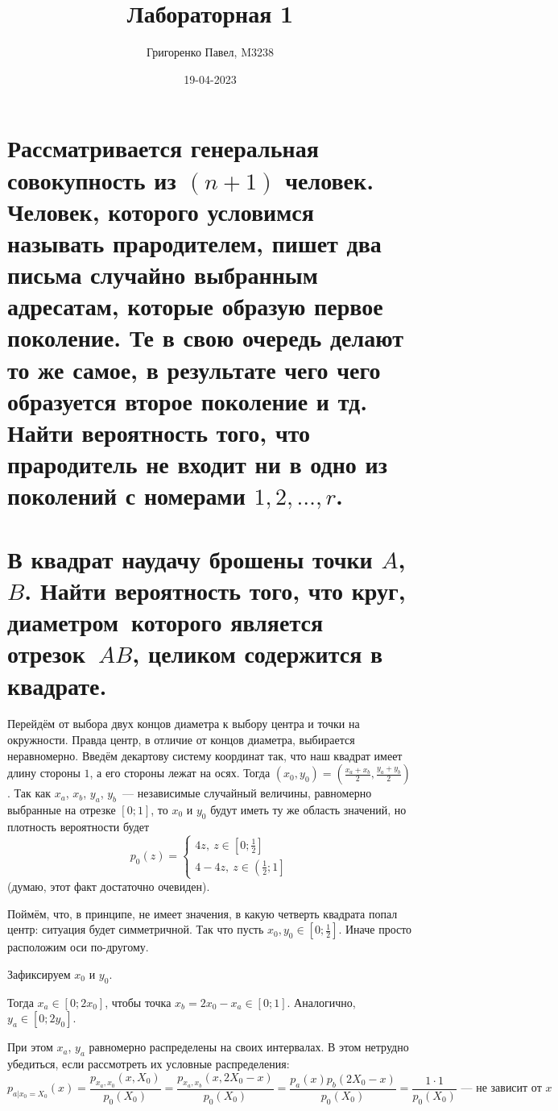 \documentclass{report}
\title{Лабораторная 1}
\author{Григоренко Павел, M3238}
\date{19-04-2023}
\begin{document}
\maketitle
\chapter{
Рассматривается генеральная совокупность из $(n+1)$ человек.
Человек, которого условимся называть прародителем,
пишет два письма случайно выбранным адресатам,
которые образую первое поколение.
Те в свою очередь делают то же самое,
в результате чего чего образуется второе поколение и тд.
Найти вероятность того, что прародитель не входит ни в одно из поколений с номерами $1,2,\dots,r$.
}

\chapter{
В квадрат наудачу брошены точки $A$, $B$.
Найти вероятность того, что круг, диаметром~которого является отрезок~$AB$,
целиком содержится в квадрате.
}

Перейдём от выбора двух концов диаметра к выбору центра и точки на окружности.
Правда центр, в отличие от концов диаметра, выбирается неравномерно.
Введём декартову систему координат так, что наш квадрат имеет длину стороны $1$,
а его стороны лежат на осях. Тогда $(x_0, y_0)=\left(\frac{x_a+x_b}{2}, \frac{y_a+y_b}{2}\right)$.
Так как $x_a$, $x_b$, $y_a$, $y_b$~--- независимые случайный величины,
равномерно выбранные на отрезке $[0;1]$, то $x_0$ и $y_0$ будут иметь ту же область значений,
но плотность вероятности будет
\[
 p_0(z)=\begin{cases}
    4z,\ z\in\left[0;\frac{1}{2}\right]\\
    4-4z,\ z\in\left(\frac{1}{2};1\right]
   \end{cases}
\] (думаю, этот факт достаточно очевиден).

Поймём, что, в принципе, не имеет значения, в какую четверть квадрата попал центр:
ситуация будет симметричной.
Так что пусть $x_0,y_0 \in \left[0;\frac{1}{2}\right]$.
Иначе просто расположим оси по-другому.

Зафиксируем $x_0$ и $y_0$.

Тогда $x_a \in [0; 2x_0]$, чтобы точка $x_b=2x_0-x_a\in[0;1]$.
Аналогично, $y_a\in[0;2y_0]$.

При этом $x_a$, $y_a$ равномерно распределены на своих интервалах.
В этом нетрудно убедиться, если рассмотреть их условные распределения:
\[
    p_{a|x_0=X_0}(x)=
    \frac{p_{x_a,x_0}(x, X_0)}{p_0(X_0)}=
    \frac{p_{x_a,x_b}(x, 2X_0-x)}{p_0(X_0)}=
    \frac{p_a(x) p_b(2X_0-x)}{p_0(X_0)}=
    \frac{1 \cdot 1}{p_0(X_0)}\text{~--- не зависит от $x$}
\]
\end{document}
